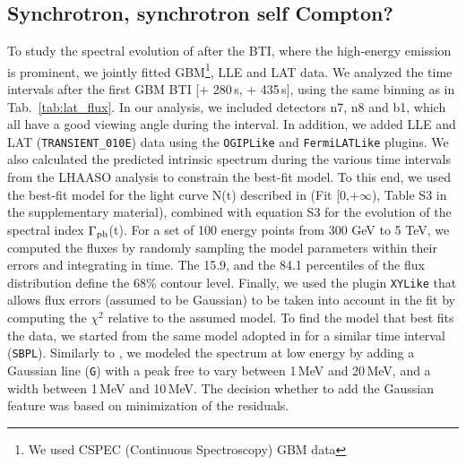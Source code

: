 \documentclass[preprint]{aastex631}
\begin{document}
\subsection{Synchrotron, synchrotron self Compton?}
\label{sec:jointLATGBM}
To study the spectral evolution of \grb after the BTI, where the high-energy emission is prominent, we jointly fitted GBM\footnote{We used CSPEC (Continuous Spectroscopy) GBM data}, LLE and LAT data. 
We analyzed the time intervals after the first GBM BTI [\trig + 280\,s, \trig + 435\,s], using the same binning as in Tab.~\ref{tab:lat_flux}. 
In our analysis, we included detectors n7, n8 and b1, which all have a good viewing angle during the interval. 
In addition, we added LLE and LAT (\texttt{TRANSIENT\_010E}) data using the \ThreeML \texttt{OGIPLike} and  \texttt{FermiLATLike} plugins.
We also calculated the predicted intrinsic spectrum during the various time intervals from the LHAASO analysis to constrain the best-fit model. 
To this end, we used the best-fit model for the light curve N(t) described in \citet{BOAT_LHAASO} (Fit [0,+$\infty$), Table S3 in the supplementary material), combined with equation S3 for the evolution of the spectral index $\Gamma_{\rm ph}$(t).  
For a set of 100 energy points from 300 GeV to 5 TeV, we computed the fluxes by randomly sampling the model parameters within their errors and integrating in time. The 15.9, and the 84.1 percentiles of the flux distribution define the 68\% contour level.
Finally, we used the \ThreeML plugin \texttt{XYLike} that allows flux errors (assumed to be Gaussian) to be taken into account in the fit by computing the $\chi^2$ relative to the assumed model.
To find the model that best fits the data, we started from the same model adopted in \citet{BOAT_LINE} for a similar time interval (\texttt{SBPL}). Similarly to \citet{BOAT_LINE}, we modeled the spectrum at low energy by adding a Gaussian line (\texttt{G}) with a peak free to vary between 1\,MeV and 20\,MeV, and a width between 1\,MeV and 10\,MeV. 
The decision whether to add the Gaussian feature was based on minimization of the residuals. 
\end{document}
